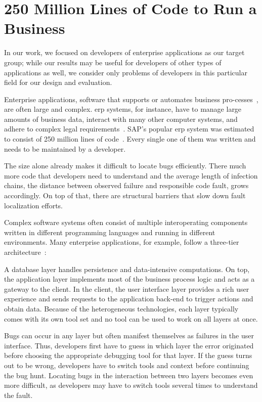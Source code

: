 \section{250 Million Lines of Code to Run a Business}

In our work, we focused on developers of enterprise applications as our target group;
\ie while our results may be useful for developers of other types of applications as well, we consider only problems of developers in this particular field for our design and evaluation.

Enterprise applications, \ie software that supports or automates business pro-\linebreak{}cesses~\cite{fowler02:patterns_of_enterprise_application}, are often large and complex.
\Ac{erp} systems, for instance, have to manage large amounts of business data, interact with many other computer systems, and adhere to complex legal requirements~\cite{linthicum00:enterprise_application_integration}.
SAP's popular \ac{erp} system was estimated to consist of 250 million lines of code~\cite{mallach15:information_systems_what_every}.
Every single one of them was written and needs to be maintained by a developer.

The size alone already makes it difficult to locate bugs efficiently.
There much more code that developers need to understand and the average length of infection chains, the distance between observed failure and responsible code fault, grows accordingly.
On top of that, there are structural barriers that slow down fault localization efforts.

Complex software systems often consist of multiple interoperating components written in different programming languages and running in different environments.
Many enterprise applications, for example, follow a three-tier architecture~\cite{fowler02:patterns_of_enterprise_application}:

A database layer handles persistence and data-intensive computations.
On top, the application layer implements most of the business process logic and acts as a gateway to the client.
In the client, the user interface layer provides a rich user experience and sends requests to the application back-end to trigger actions and obtain data.
Because of the heterogeneous technologies, each layer typically comes with its own tool set and no tool can be used to work on all layers at once.

Bugs can occur in any layer but often manifest themselves as failures in the user interface.
Thus, developers first have to guess in which layer the error originated before choosing the appropriate debugging tool for that layer.
If the guess turns out to be wrong, developers have to switch tools and context before continuing the bug hunt.
Locating bugs in the interaction between two layers becomes even more difficult, as developers may have to switch tools several times to understand the fault.

